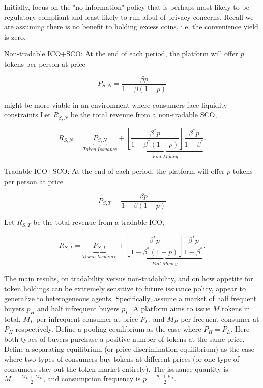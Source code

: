 Initially, focus on the "no information" policy that is perhaps most likely to
be regulatory-compliant and least likely to run afoul of privacy concerns. Recall we are assuming there is no benefit to holding excess coins, i.e. the convenience yield is zero.

Non-tradable ICO+SCO: At the end of each period, the platform will offer $p$ tokens per person at price

\begin{equation}
    P_{S,N}=\frac{\beta p}{1-\beta(1-p)}
\end{equation}

might be more viable in an environment where consumers face liquidity constraints
Let $R_{S,N}$ be the total revenue from a non-tradable SCO,

\begin{equation}
    R_{S,N} = \underbrace{P_{S,N}}_{Token~Issuance}
    +
    \underbrace{\left[\frac{\beta^{*}p}{1-\beta^{*}(1-p)}\right]
    \frac{\beta^{*}p}{1-\beta^{*}}}_{Fiat~Money}.
\end{equation}

Tradable ICO+SCO: At the end of each period, the platform will offer $p$ tokens per person at price

\begin{equation}
    P_{S,T}=\frac{\beta p}{1-\beta(1-p)}
\end{equation}

Let $R_{S,T}$ be the total revenue from a tradable ICO,

\begin{equation}
    R_{S,T} = \underbrace{P_{S,T}}_{Token~Issuance}
    +
    \underbrace{\left[\frac{\beta^{*}p}{1-\beta^{*}(1-p)}\right]
    \frac{\beta^{*}p}{1-\beta^{*}}}_{Fiat~Money}.
\end{equation}

The main results, on tradability versus non-tradability, and on how appetite for token holdings can be extremely sensitive to future issuance policy, appear to generalize to heterogeneous agents.
Specifically, assume a market of half frequent buyers $p_H$ and half infrequent
buyers $p_L$. A platform aims to issue $M$ tokens in total, $M_L$ per infrequent
consumer at price $P_L$, and $M_H$ per frequent consumer at $P_H$ respectively.
Define a pooling equilibrium  as the case where $P_H = P_L$. Here both types of buyers purchase a positive number of tokens at the same price.  Define a separating equilibrium (or price discrimination equilibrium) as the case where two types of consumers buy tokens at different prices (or one type of consumers stay out the
token market entirely). The issuance quantity is $M=\frac{M_{L}+M_{H}}{2}$, and consumption frequency is $p=\frac{p_{L}+p_{H}}{2}$.

